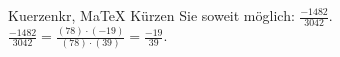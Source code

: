 \begin{MAufgabe}{Kuerzen}{kr, MaTeX}
K\"urzen Sie soweit m\"oglich: $\frac{-1482}{3042}$.\\ 
\ifLsg\MLoesung
\quad $\frac{-1482}{3042}=\frac{(78)\cdot(-19)}{(78)\cdot(39)}=\frac{-19}{39}$.\else\relax\fi
 \end{MAufgabe}
